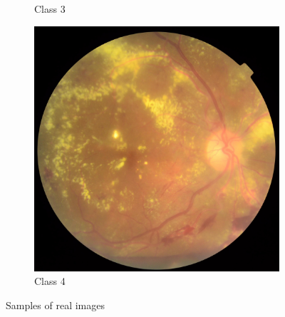 \documentclass[sigconf,nonacm]{acmart}
\begin{document}
\begin{figure}[H]
\begin{subfigure}{0.18\linewidth}
\caption{Class 3}
\end{subfigure}
\begin{subfigure}{0.18\linewidth}
\centering
\includegraphics[width=0.9\linewidth]{real-class4.png}
\caption{Class 4}
\end{subfigure}
\caption{Samples of real images}
\label{fig:gan-real}
\end{figure}
\end{document}
